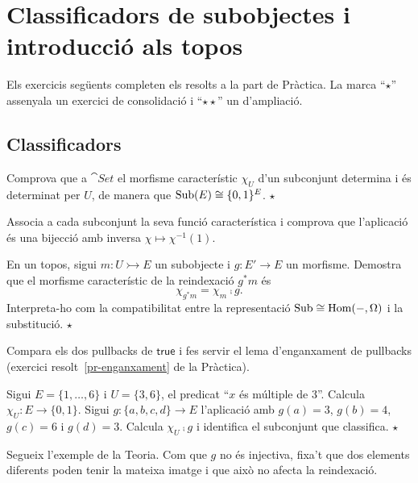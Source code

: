 \chapter[Classificadors de subobjectes i topos]{\texorpdfstring{Classificadors de subobjectes i introducció als topos}{Classificadors de subobjectes i introducció als topos}}

Els exercicis següents completen els resolts a la part de Pràctica. La marca \enquote{$\star$} assenyala un exercici de consolidació i \enquote{$\star\star$} un d'ampliació.

\section{Classificadors}

\begin{exercici}
Comprova que a $\cat{Set}$ el morfisme característic $\chi_U$ d'un subconjunt determina i és determinat per $U$, de manera que $\operatorname{Sub}(E)\cong\{0,1\}^{E}$. \hfill{\normalfont$\star$}
\begin{indicacio}
Associa a cada subconjunt la seva funció característica i comprova que l'aplicació és una bijecció amb inversa $\chi\mapsto\chi^{-1}(1)$.
\end{indicacio}
\end{exercici}

\begin{exercici}
En un topos, sigui $m\colon U\rightarrowtail E$ un subobjecte i $g\colon E'\to E$ un morfisme. Demostra que el morfisme característic de la reindexació $g^{*}m$ és
\[
\chi_{g^{*}m}=\chi_m\comp g.
\]
Interpreta-ho com la compatibilitat entre la representació $\operatorname{Sub}\cong\operatorname{Hom}(-,\Omega)$ i la substitució. \hfill{\normalfont$\star$}
\begin{indicacio}
Compara els dos pullbacks de $\mathsf{true}$ i fes servir el lema d'enganxament de pullbacks (exercici resolt~\ref{pr-enganxament} de la Pràctica).
\end{indicacio}
\end{exercici}

\begin{exercici}
Sigui $E=\{1,\dots,6\}$ i $U=\{3,6\}$, el predicat \enquote{$x$ és múltiple de $3$}. Calcula $\chi_U\colon E\to\{0,1\}$. Sigui $g\colon\{a,b,c,d\}\to E$ l'aplicació amb $g(a)=3$, $g(b)=4$, $g(c)=6$ i $g(d)=3$. Calcula $\chi_U\comp g$ i identifica el subconjunt que classifica. \hfill{\normalfont$\star$}
\begin{indicacio}
Segueix l'exemple de la Teoria. Com que $g$ no és injectiva, fixa't que dos elements diferents poden tenir la mateixa imatge i que això no afecta la reindexació.
\end{indicacio}
\end{exercici}

